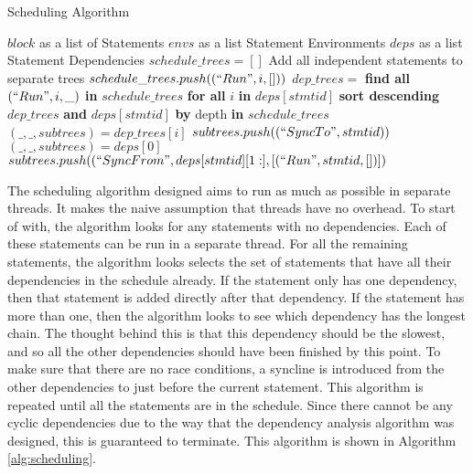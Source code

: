 \begin{algorithm}[H]
\caption{Scheduling Algorithm}
\label{alg:scheduling}
\begin{algorithmic}[1]
    \Require $block$ as a list of Statements
    \Require $envs$ as a list Statement Environments
    \Require $deps$ as a list Statement Dependencies
    \State $schedule\_trees = []$
     \Comment Add all independent statements to separate trees
            \State $schedule\_trees.push((``Run", i, []))$
        \EndIf
    \EndFor
                \State $dep\_trees =$ \textbf{find all} $(``Run", i, \_)$ \textbf{in} $schedule\_trees$ \textbf{for all} $i$ \textbf{in} $deps[stmtid]$
                \State \textbf{sort descending} $dep\_trees$ \textbf{and} $deps[stmtid]$ \textbf{by} depth \textbf{in} $schedule\_trees$
                    \State $(\_,\_,subtrees) = dep\_trees[i]$
                    \State $subtrees.push((``SyncTo", stmtid))$
                \EndFor
                \State $(\_,\_,subtrees) = deps[0]$
                \State $subtrees.push((``SyncFrom", deps[stmtid][1:], [(``Run", stmtid, [])])$
            \EndIf
        \EndFor
    \EndWhile
\end{algorithmic}
\end{algorithm}

 The scheduling algorithm designed aims to run as much as possible in separate threads. It makes the naive assumption that threads have no overhead. To start of with, the algorithm looks for any statements with no dependencies. Each of these statements can be run in a separate thread. For all the remaining statements, the algorithm looks selects the set of statements that have all their dependencies in the schedule already. If the statement only has one dependency, then that statement is added directly after that dependency. If the statement has more than one, then the algorithm looks to see which dependency has the longest chain. The thought behind this is that this dependency should be the slowest, and so all the other dependencies should have been finished by this point. To make sure that there are no race conditions, a syncline is introduced from the other dependencies to just before the current statement. This algorithm is repeated until all the statements are in the schedule. Since there cannot be any cyclic dependencies due to the way that the dependency analysis algorithm was designed, this is guaranteed to terminate. This algorithm is shown in Algorithm \autoref{alg:scheduling}.
